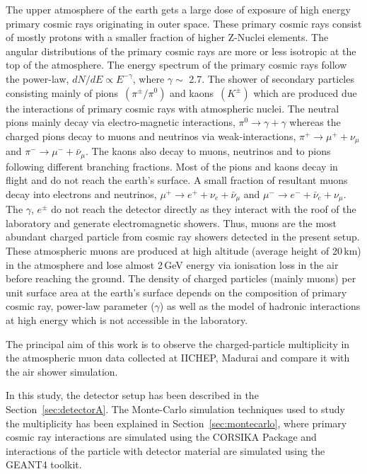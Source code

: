 The upper atmosphere of the earth gets a large dose of exposure of
high energy primary cosmic rays originating in outer space. These
primary cosmic rays consist of mostly protons with a smaller fraction
of higher \mbox{Z-Nuclei} elements\cite{cosmic1}. The angular
distributions of the primary cosmic rays are more or less isotropic
at the top of the atmosphere. The energy spectrum of the primary
cosmic rays follow the power-law, $dN/dE \propto E^{-\gamma}$,
where $\gamma \sim $ 2.7. The shower of secondary
particles consisting mainly of
\mbox{pions $\left(\pi^{\pm}/\pi^0\right)$} and
\mbox{kaons $\left(K^{\pm}\right)$} which are produced due the
interactions of primary cosmic rays with atmospheric nuclei.
The neutral pions mainly decay via electro-magnetic interactions,
$\pi^0 \rightarrow \gamma+\gamma$ whereas the charged pions decay to
muons and neutrinos via weak-interactions,
$\pi^+ \rightarrow \mu^+ + \nu_{\mu}$ and
$\pi^- \rightarrow \mu^- + \bar{\nu}_{\mu}$. The kaons also decay to
muons, neutrinos and to pions following different branching fractions.
Most of the pions and kaons decay in flight and do not reach the
earth's surface.
 A small fraction of resultant muons decay into
electrons and neutrinos, 
$\mu^+ \rightarrow e^+ + \nu_{e} + \bar{\nu}_{\mu}$ and 
$\mu^- \rightarrow e^- + \bar{\nu}_{e} + \nu_{\mu}$. 
The $\gamma$, $e^{\pm}$ do not reach the detector directly as they
interact with the roof of the laboratory and generate electromagnetic
showers.
Thus, muons are the
most abundant charged particle from cosmic ray showers detected in the
present setup. These atmospheric muons are produced at high altitude
(average height of 20\,km) in the atmosphere and lose almost 2\,GeV
energy via ionisation loss in the air before reaching the ground. The 
density of charged particles (mainly muons) per unit surface area at
the earth's surface depends on the composition of primary cosmic ray,
power-law parameter ($\gamma$) as well as the model of hadronic
interactions at high energy which is not accessible in the laboratory.

The principal aim of this work is to observe the charged-particle
multiplicity in the atmospheric muon data collected
at IICHEP, Madurai and compare it with the air shower simulation.

In this study, the detector setup has been described in
the Section~\ref{sec:detectorA}. The Monte-Carlo simulation techniques
used to study the multiplicity has been explained in
Section~\ref{sec:montecarlo}, where primary cosmic ray interactions
are simulated using the CORSIKA Package\cite{corsika763} and
interactions of the particle with detector material are simulated
using the GEANT4 toolkit\cite{geant4}.


